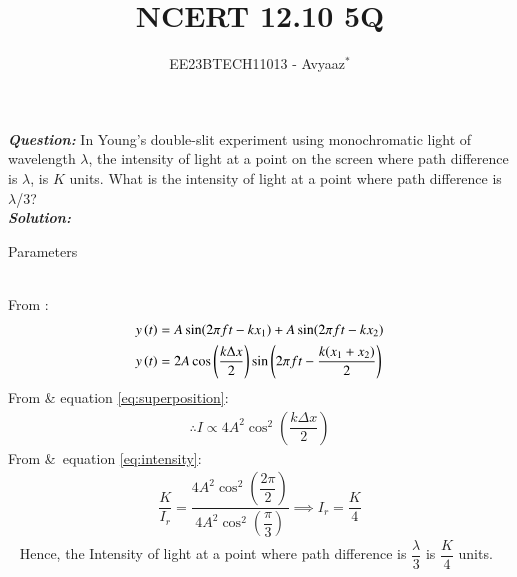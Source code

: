 \documentclass[journal,12pt,twocolumn]{IEEEtran}
\theoremstyle{remark}
\begin{document}

\vspace{3cm}

\title{NCERT 12.10 5Q}
\author{EE23BTECH11013 - Avyaaz$^{*}$%
}
\maketitle
\newpage
\bigskip

\renewcommand{\thefigure}{\arabic{figure}}
\renewcommand{\thetable}{\arabic{table}}

\large\textbf{\textsl{Question:}}
In Young’s double-slit experiment using monochromatic light of wavelength $\lambda$, the intensity of light at a point on the screen where path difference is $\lambda$, is $K$ units. What is the intensity of light at a
point where path difference is $\lambda$/3?\\
\large\textbf{\textsl{Solution:}}
\begin{table}[htbp]
\setlength{\extrarowheight}{8pt}
\centering

\vspace{0.2cm}
\caption{Parameters}
\label{tab:parameters}
\end{table}\\
From :
\begin{align}
y\left(t\right) &= A\sin({2\pi f t - kx_1})  + A\sin({ 2\pi f t - kx_2}) \\
y\left(t\right) &=  2A\cos\left(\dfrac{k\Delta x}{2}\right)\sin\left(2\pi f t - \dfrac{k(x_1+x_2)}{2} \right) \label{eq:superposition}
\end{align}
From  \&  equation \eqref{eq:superposition}: 
\begin{align}
\therefore I \propto 4A^2\cos^2\left(\dfrac{k\Delta x}{2}\right)  \label{eq:intensity}
\end{align}
From  \& \,equation \eqref{eq:intensity}: 
\begin{align}
 \dfrac{K}{I_r} = \dfrac{4A^2\cos^2\left(\dfrac{2\pi}{2}\right)}{4A^2\cos^2\left(\dfrac{\pi}{3}\right)}
 \implies I_r = \dfrac{K}{4}
 \end{align}
\,\,\, Hence, the Intensity of light at a point where path difference is $\dfrac{\lambda}{3}$ is $\dfrac{K}{4}$ units.
\end{document}
